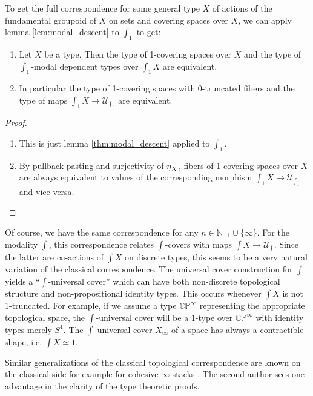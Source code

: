 \documentclass[9pt,twosided]{amsart}
\newcommand{\shape}{\int}
\newcommand{\bC}{\mathbb C}
\newcommand{\bN}{\mathbb N}
\newcommand{\bP}{\mathbb P}
\begin{document}
To get the full correspondence for some general type $X$ of actions of the fundamental groupoid of $X$ on sets and covering spaces over $X$,
we can apply lemma \ref{lem:modal_descent} to $\shape_1$ to get:

\begin{thm}
  \begin{enumerate}
  \item Let $X$ be a type. Then the type of 1-covering spaces over $X$ and the type of $\shape_1$-modal dependent types over $\shape_1 X$ are equivalent.
  \item In particular the type of 1-covering spaces with 0-truncated fibers and the type of maps $\shape_1X\to \mathcal U_{\shape_0}$ are equivalent.
  \end{enumerate}
\end{thm}
\begin{proof}
  \begin{enumerate}
  \item This is just lemma \ref{thm:modal_descent} applied to $\shape_1$.
  \item By pullback pasting and surjectivity of ${\eta_{}}_X$, fibers of 1-covering spaces over $X$ are always equivalent to values of the corresponding morphism $\shape_1 X\to \mathcal U_{\shape_1}$ and vice versa.
  \end{enumerate}
\end{proof}

Of course, we have the same correspondence for any $n\in\bN_{-1}\cup\{\infty\}$.
For the modality $\shape$, this correspondence relates $\shape$-covers with 
maps $\shape X\to\mathcal U_{\shape}$.
Since the latter are $\infty$-actions of $\shape X$ on discrete types, this seems to be a very natural variation of the classical correspondence.
The universal cover construction for $\shape$ yields a ``$\shape$-universal cover'' 
which can have both non-discrete topological structure and
non-propositional identity types.
This occurs whenever $\shape X$ is not 1-truncated.
For example, if we assume a type $\bC\bP^\infty$ representing the appropriate topological space,
the $\shape$-universal cover will be a $1$-type over $\bC\bP^\infty$ with identity types merely $S^1$.
The $\shape$-universal cover $\widetilde{X}_\infty$ of a space has always a contractible shape, i.e. $\shape X \simeq 1$.


Similar generalizations of the classical topological correspondence are known on the classical side
for example for cohesive $\infty$-stacks \cite[Section 5.2.7]{SchreiberDcct}.
The second author sees one advantage in the clarity of the type theoretic proofs.
\end{document}
